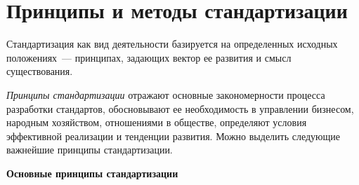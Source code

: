 \section{Принципы и методы стандартизации}
Стандартизация как вид деятельности базируется на определенных исходных положениях~--- принципах, задающих вектор ее развития и смысл существования. 

\textit{Принципы стандартизации} отражают основные закономерности процесса разработки стандартов, обосновывают ее необходимость в управлении бизнесом, народным хозяйством, отношениями в обществе, определяют условия эффективной реализации и тенденции развития. Можно выделить следующие важнейшие принципы стандартизации. 

\begin{flushleft}
\textbf{Основные принципы стандартизации}
\end{flushleft}

